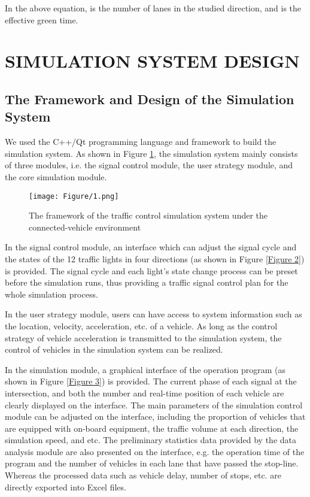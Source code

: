 \documentclass[10.5pt,compsoc]{TsT}
\theoremstyle{mystyle}
\begin{document}
{In the above equation, is the number of lanes in the studied direction,
and is the effective green time.

\section{SIMULATION SYSTEM DESIGN}
\noindent
\subsection{The Framework and Design of the Simulation System}
\noindent
We used the C++/Qt programming language and framework to build the
simulation system. As shown in Figure \ref{Figure 1}, the simulation system mainly
consists of three modules, i.e. the signal control module, the user
strategy module, and the core simulation module.
\begin{figure}[H]
\centering
\texttt{[image: Figure/1.png]}
\caption{The framework of the traffic control simulation system under
the connected-vehicle environment}
\label{Figure 1}
\end{figure}

In the signal control module, an interface which can adjust the signal
cycle and the states of the 12 traffic lights in four directions (as
shown in Figure \ref{Figure 2}) is provided. The signal cycle and each light's state
change process can be preset before the simulation runs, thus providing
a traffic signal control plan for the whole simulation process.

In the user strategy module, users can have access to system information
such as the location, velocity, acceleration, etc. of a vehicle. As long
as the control strategy of vehicle acceleration is transmitted to the
simulation system, the control of vehicles in the simulation system can
be realized.

In the simulation module, a graphical interface of the operation program
(as shown in Figure \ref{Figure 3}) is provided. The current phase of each signal at
the intersection, and both the number and real-time position of each
vehicle are clearly displayed on the interface. The main parameters of
the simulation control module can be adjusted on the interface,
including the proportion of vehicles that are equipped with on-board
equipment, the traffic volume at each direction, the simulation speed,
and etc. The preliminary statistics data provided by the data analysis
module are also presented on the interface, e.g. the operation time of
the program and the number of vehicles in each lane that have passed the
stop-line. Whereas the processed data such as vehicle delay, number of
stops, etc. are directly exported into Excel files.

}
\end{document}
